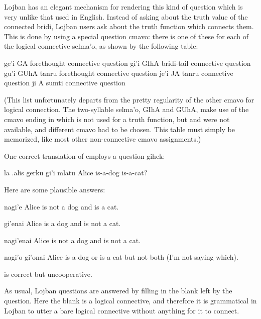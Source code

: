 Lojban has an elegant mechanism for rendering this kind of
    question which is very unlike that used in English. Instead of
    asking about the truth value of the connected bridi, Lojban
    users ask about the truth function which connects them. This is
    done by using a special question cmavo: there is one of these
    for each of the logical connective selma'o, as shown by the
    following table:

   ge'i    GA  forethought connective question
    gi'i    GIhA    bridi-tail connective question
    gu'i    GUhA    tanru forethought connective question
    je'i    JA  tanru connective question
    ji  A   sumti connective question

(This list unfortunately departs from the pretty regularity of
    the other cmavo for logical connection. The two-syllable
    selma'o, GIhA and GUhA, make use of the cmavo ending in 
    which is not used for a truth function, but  and 
    were not available, and different cmavo had to be chosen. This
    table must simply be memorized, like most other non-connective
    cmavo assignments.) 

One correct translation of 
    employs a question gihek:
\begin{example}
la .alis gerku gi'i mlatu\n
Alice is-a-dog  is-a-cat?
\end{example}

Here are some plausible answers:
\begin{example}
nagi'e\n
Alice is not a dog and is a cat.
\end{example}

\begin{example}
gi'enai\n
Alice is a dog and is not a cat.
\end{example}

\begin{example}
nagi'enai\n
Alice is not a dog and is not a cat.
\end{example}

\begin{example}
nagi'o\n
gi'onai\n
Alice is a dog or is a cat but not both\n
\T	(I'm not saying which).
\end{example}

 is correct but
    uncooperative. 

As usual, Lojban questions are answered by filling in the
    blank left by the question. Here the blank is a logical
    connective, and therefore it is grammatical in Lojban to utter
    a bare logical connective without anything for it to
    connect.

